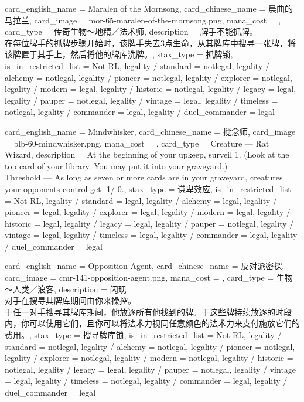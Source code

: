 \documentclass[lang = cn, color = black, 10pt]{AllThatStax}
\begin{document}
\card
{
	card_english_name = {Maralen of the Mornsong},
	card_chinese_name = {晨曲的马拉兰},
	card_image = mor-65-maralen-of-the-mornsong.png,
	mana_cost = ,
	card_type = 传奇生物～地精／法术师,
	description = {牌手不能抓牌。\\
		在每位牌手的抓牌步骤开始时，该牌手失去3点生命，从其牌库中搜寻一张牌，将该牌置于其手上，然后将他的牌库洗牌。},
	stax_type = 抓牌锁,
	is_in_restricted_list = Not RL,
	legality / standard = notlegal,
	legality / alchemy = notlegal,
	legality / pioneer = notlegal,
	legality / explorer = notlegal,
	legality / modern = legal,
	legality / historic = notlegal,
	legality / legacy = legal,
	legality / pauper = notlegal,
	legality / vintage = legal,
	legality / timeless = notlegal,
	legality / commander = legal,
	legality / duel_commander = legal
}

\card
{
	card_english_name = {Mindwhisker},
	card_chinese_name = {搅念师},
	card_image = blb-60-mindwhisker.png,
	mana_cost = ,
	card_type = Creature — Rat Wizard,
	description = {At the beginning of your upkeep, surveil 1. (Look at the top card of your library. You may put it into your graveyard.)\\
		Threshold — As long as seven or more cards are in your graveyard, creatures your opponents control get -1/-0.},
	stax_type = 谦卑效应,
	is_in_restricted_list = Not RL,
	legality / standard = legal,
	legality / alchemy = legal,
	legality / pioneer = legal,
	legality / explorer = legal,
	legality / modern = legal,
	legality / historic = legal,
	legality / legacy = legal,
	legality / pauper = notlegal,
	legality / vintage = legal,
	legality / timeless = legal,
	legality / commander = legal,
	legality / duel_commander = legal
}

\card
{
	card_english_name = {Opposition Agent},
	card_chinese_name = {反对派密探},
	card_image = cmr-141-opposition-agent.png,
	mana_cost = ,
	card_type = 生物 ～人类／浪客,
	description = {闪现\\
		对手在搜寻其牌库期间由你来操控。\\
		于任一对手搜寻其牌库期间，他放逐所有他找到的牌。于这些牌持续放逐的时段内，你可以使用它们，且你可以将法术力视同任意颜色的法术力来支付施放它们的费用。},
	stax_type = 搜寻牌库锁,
	is_in_restricted_list = Not RL,
	legality / standard = notlegal,
	legality / alchemy = notlegal,
	legality / pioneer = notlegal,
	legality / explorer = notlegal,
	legality / modern = notlegal,
	legality / historic = notlegal,
	legality / legacy = legal,
	legality / pauper = notlegal,
	legality / vintage = legal,
	legality / timeless = notlegal,
	legality / commander = legal,
	legality / duel_commander = legal
}
\end{document}
